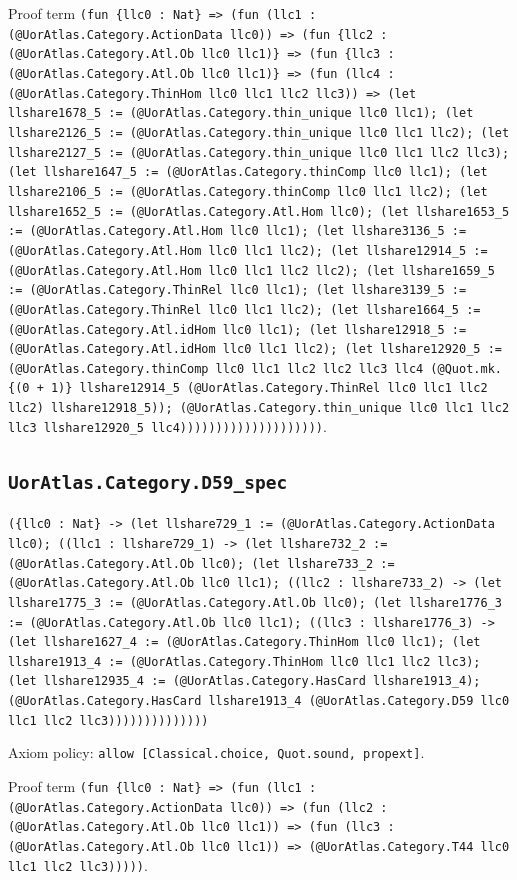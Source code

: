\documentclass[11pt]{article}
\begin{document}
\noindent Proof term \texttt{(fun \{llc0 : Nat\} => (fun (llc1 : (@UorAtlas.Category.ActionData llc0)) => (fun \{llc2 : (@UorAtlas.Category.Atl.Ob llc0 llc1)\} => (fun \{llc3 : (@UorAtlas.Category.Atl.Ob llc0 llc1)\} => (fun (llc4 : (@UorAtlas.Category.ThinHom llc0 llc1 llc2 llc3)) => (let llshare1678\_5 := (@UorAtlas.Category.thin\_unique llc0 llc1); (let llshare2126\_5 := (@UorAtlas.Category.thin\_unique llc0 llc1 llc2); (let llshare2127\_5 := (@UorAtlas.Category.thin\_unique llc0 llc1 llc2 llc3); (let llshare1647\_5 := (@UorAtlas.Category.thinComp llc0 llc1); (let llshare2106\_5 := (@UorAtlas.Category.thinComp llc0 llc1 llc2); (let llshare1652\_5 := (@UorAtlas.Category.Atl.Hom llc0); (let llshare1653\_5 := (@UorAtlas.Category.Atl.Hom llc0 llc1); (let llshare3136\_5 := (@UorAtlas.Category.Atl.Hom llc0 llc1 llc2); (let llshare12914\_5 := (@UorAtlas.Category.Atl.Hom llc0 llc1 llc2 llc2); (let llshare1659\_5 := (@UorAtlas.Category.ThinRel llc0 llc1); (let llshare3139\_5 := (@UorAtlas.Category.ThinRel llc0 llc1 llc2); (let llshare1664\_5 := (@UorAtlas.Category.Atl.idHom llc0 llc1); (let llshare12918\_5 := (@UorAtlas.Category.Atl.idHom llc0 llc1 llc2); (let llshare12920\_5 := (@UorAtlas.Category.thinComp llc0 llc1 llc2 llc2 llc3 llc4 (@Quot.mk.\{(0 + 1)\} llshare12914\_5 (@UorAtlas.Category.ThinRel llc0 llc1 llc2 llc2) llshare12918\_5)); (@UorAtlas.Category.thin\_unique llc0 llc1 llc2 llc3 llshare12920\_5 llc4))))))))))))))))))))}.\par
\subsection*{\texttt{UorAtlas.Category.D59\_spec}}
\noindent\texttt{(\{llc0 : Nat\} -> (let llshare729\_1 := (@UorAtlas.Category.ActionData llc0); ((llc1 : llshare729\_1) -> (let llshare732\_2 := (@UorAtlas.Category.Atl.Ob llc0); (let llshare733\_2 := (@UorAtlas.Category.Atl.Ob llc0 llc1); ((llc2 : llshare733\_2) -> (let llshare1775\_3 := (@UorAtlas.Category.Atl.Ob llc0); (let llshare1776\_3 := (@UorAtlas.Category.Atl.Ob llc0 llc1); ((llc3 : llshare1776\_3) -> (let llshare1627\_4 := (@UorAtlas.Category.ThinHom llc0 llc1); (let llshare1913\_4 := (@UorAtlas.Category.ThinHom llc0 llc1 llc2 llc3); (let llshare12935\_4 := (@UorAtlas.Category.HasCard llshare1913\_4); (@UorAtlas.Category.HasCard llshare1913\_4 (@UorAtlas.Category.D59 llc0 llc1 llc2 llc3))))))))))))))}\par
\noindent Axiom policy: \texttt{allow [Classical.choice, Quot.sound, propext]}.\par
\noindent Proof term \texttt{(fun \{llc0 : Nat\} => (fun (llc1 : (@UorAtlas.Category.ActionData llc0)) => (fun (llc2 : (@UorAtlas.Category.Atl.Ob llc0 llc1)) => (fun (llc3 : (@UorAtlas.Category.Atl.Ob llc0 llc1)) => (@UorAtlas.Category.T44 llc0 llc1 llc2 llc3)))))}.\par
\end{document}

